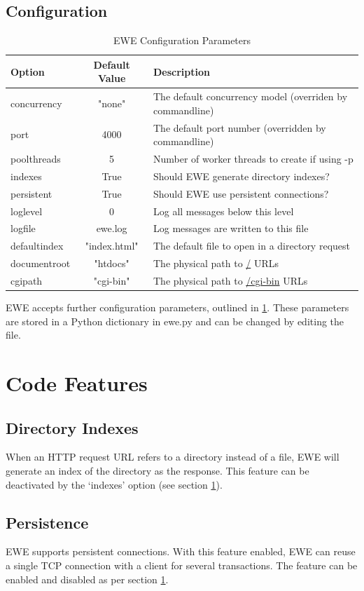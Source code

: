 \documentclass{article}
\begin{document}
\subsection{Configuration}\label{config}
\begin{table}[h]
\begin{tabular}{|l|c|l|}
\hline
Option & Default Value & Description \\
\hline
concurrency & "none" & The default concurrency model (overriden by commandline) \\
port & 4000 & The default port number (overridden by commandline) \\
poolthreads & 5 & Number of worker threads to create if using -p \\
indexes & True & Should EWE generate directory indexes? \\
persistent & True & Should EWE use persistent connections? \\
loglevel & 0 & Log all messages below this level \\
logfile & ewe.log & Log messages are written to this file \\
defaultindex & "index.html" & The default file to open in a directory request\\
documentroot & "htdocs" & The physical path to \url{/} URLs \\
cgipath & "cgi-bin" & The physical path to \url{/cgi-bin} URLs \\
\hline
\end{tabular}
\caption{EWE Configuration Parameters}\label{config}
\end{table}

EWE accepts further configuration parameters, outlined in \ref{config}.
These parameters are stored in a Python dictionary in ewe.py and can be changed by editing the file.

\section{Code Features}
\subsection{Directory Indexes}
When an HTTP request URL refers to a directory instead of a file, EWE will generate an index of the directory as the response.
This feature can be deactivated by the `indexes' option (see section \ref{config}).

\subsection{Persistence}
EWE supports persistent connections.
With this feature enabled, EWE can reuse a single TCP connection with a client for several transactions.
The feature can be enabled and disabled as per section \ref{config}.
\end{document}
